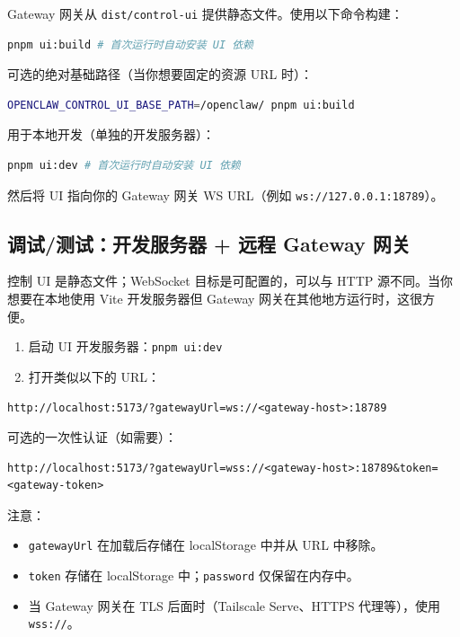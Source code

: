 Gateway 网关从 \texttt{dist/control-ui} 提供静态文件。使用以下命令构建：

\begin{lstlisting}[language=bash]
pnpm ui:build # 首次运行时自动安装 UI 依赖
\end{lstlisting}


可选的绝对基础路径（当你想要固定的资源 URL 时）：

\begin{lstlisting}[language=bash]
OPENCLAW_CONTROL_UI_BASE_PATH=/openclaw/ pnpm ui:build
\end{lstlisting}


用于本地开发（单独的开发服务器）：

\begin{lstlisting}[language=bash]
pnpm ui:dev # 首次运行时自动安装 UI 依赖
\end{lstlisting}


然后将 UI 指向你的 Gateway 网关 WS URL（例如 \texttt{ws://127.0.0.1:18789}）。

\subsection{调试/测试：开发服务器 + 远程 Gateway 网关}


控制 UI 是静态文件；WebSocket 目标是可配置的，可以与 HTTP 源不同。当你想要在本地使用 Vite 开发服务器但 Gateway 网关在其他地方运行时，这很方便。

\begin{enumerate}
  \item 启动 UI 开发服务器：\texttt{pnpm ui:dev}
  \item 打开类似以下的 URL：
\end{enumerate}


\begin{lstlisting}
http://localhost:5173/?gatewayUrl=ws://<gateway-host>:18789
\end{lstlisting}


可选的一次性认证（如需要）：

\begin{lstlisting}
http://localhost:5173/?gatewayUrl=wss://<gateway-host>:18789&token=<gateway-token>
\end{lstlisting}


注意：

\begin{itemize}
  \item \texttt{gatewayUrl} 在加载后存储在 localStorage 中并从 URL 中移除。
  \item \texttt{token} 存储在 localStorage 中；\texttt{password} 仅保留在内存中。
  \item 当 Gateway 网关在 TLS 后面时（Tailscale Serve、HTTPS 代理等），使用 \texttt{wss://}。
\end{itemize}


